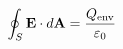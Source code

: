 \documentclass[preview]{standalone}
\begin{document}
\begin{align*}
\special{dvisvgm:raw <g id='unique000'>}\oint_S\mathbf E\cdot d\mathbf A=\frac{Q_{\rm env}}{\varepsilon_0}\special{dvisvgm:raw </g>}
\end{align*}
\end{document}
